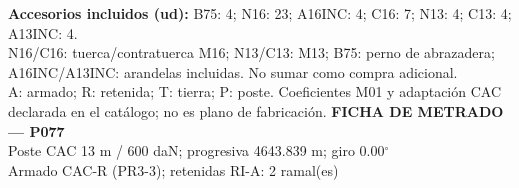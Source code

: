 \begingroup\scriptsize
\textbf{Accesorios incluidos (ud):} B75: 4; N16: 23; A16INC: 4; C16: 7; N13: 4; C13: 4; A13INC: 4.\\
N16/C16: tuerca/contratuerca M16; N13/C13: M13; B75: perno de abrazadera; A16INC/A13INC: arandelas incluidas. No sumar como compra adicional.\\
A: armado; R: retenida; T: tierra; P: poste. Coeficientes M01 y adaptación CAC declarada en el catálogo; no es plano de fabricación.
\endgroup\endgroup
\clearpage{}
\begingroup\small\setlength{\parskip}{3pt}\renewcommand{\arraystretch}{1.05}
\textbf{\large FICHA DE METRADO — P077}\\[4pt]
Poste CAC 13 m / 600 daN; progresiva 4643.839 m; giro 0.00\ensuremath{^\circ}\\
Armado CAC-R (PR3-3); retenidas RI-A: 2 ramal(es)\\
\begingroup\scriptsize
